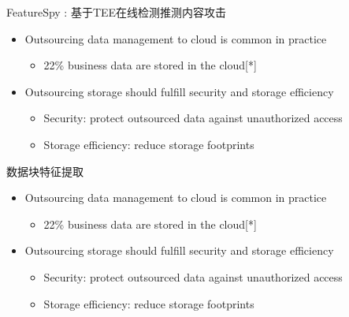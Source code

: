 \documentclass{beamer}
\newcommand{\sysnameF}{FeatureSpy }
\begin{document}
\begin{frame}{\sysnameF: 基于TEE在线检测推测内容攻击}
    \begin{itemize}
        \item Outsourcing data management to cloud is common in practice
              \begin{itemize}
                  \item 22\% business data are stored in the cloud[*]
              \end{itemize}
        \item  Outsourcing storage should fulfill security and storage efficiency
              \begin{itemize}
                  \item  Security: protect outsourced data against unauthorized access
                  \item  Storage efficiency: reduce storage footprints
              \end{itemize}
    \end{itemize}
\end{frame}

\begin{frame}{数据块特征提取}
    \begin{itemize}
        \item Outsourcing data management to cloud is common in practice
              \begin{itemize}
                  \item 22\% business data are stored in the cloud[*]
              \end{itemize}
        \item  Outsourcing storage should fulfill security and storage efficiency
              \begin{itemize}
                  \item  Security: protect outsourced data against unauthorized access
                  \item  Storage efficiency: reduce storage footprints
              \end{itemize}
    \end{itemize}
\end{frame}
\end{document}
